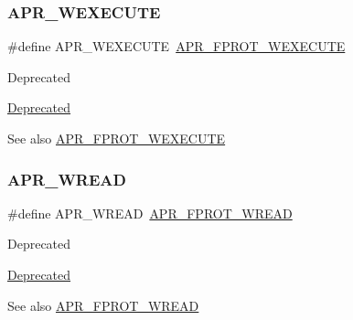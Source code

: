 \subsubsection{\texorpdfstring{A\+P\+R\+\_\+\+W\+E\+X\+E\+C\+U\+TE}{APR\_WEXECUTE}}
{\footnotesize\ttfamily \#define A\+P\+R\+\_\+\+W\+E\+X\+E\+C\+U\+TE~\mbox{\hyperlink{group__apr__file__permissions_ga760d69c09b38ddf1e0aff09362d8ce11}{A\+P\+R\+\_\+\+F\+P\+R\+O\+T\+\_\+\+W\+E\+X\+E\+C\+U\+TE}}}

\begin{DoxyRefDesc}{Deprecated}
\item[\mbox{\hyperlink{deprecated__deprecated000014}{Deprecated}}]\end{DoxyRefDesc}
\begin{DoxySeeAlso}{See also}
\mbox{\hyperlink{group__apr__file__permissions_ga760d69c09b38ddf1e0aff09362d8ce11}{A\+P\+R\+\_\+\+F\+P\+R\+O\+T\+\_\+\+W\+E\+X\+E\+C\+U\+TE}} 
\end{DoxySeeAlso}
\mbox{\label{group__apr__file__permissions_ga5c987d2b1ace95b4ffa7c5a322721aad}} 
\subsubsection{\texorpdfstring{A\+P\+R\+\_\+\+W\+R\+E\+AD}{APR\_WREAD}}
{\footnotesize\ttfamily \#define A\+P\+R\+\_\+\+W\+R\+E\+AD~\mbox{\hyperlink{group__apr__file__permissions_ga194718630250b0f0dd4be38c86dac717}{A\+P\+R\+\_\+\+F\+P\+R\+O\+T\+\_\+\+W\+R\+E\+AD}}}

\begin{DoxyRefDesc}{Deprecated}
\item[\mbox{\hyperlink{deprecated__deprecated000012}{Deprecated}}]\end{DoxyRefDesc}
\begin{DoxySeeAlso}{See also}
\mbox{\hyperlink{group__apr__file__permissions_ga194718630250b0f0dd4be38c86dac717}{A\+P\+R\+\_\+\+F\+P\+R\+O\+T\+\_\+\+W\+R\+E\+AD}} 
\end{DoxySeeAlso}
\mbox{\label{group__apr__file__permissions_ga824d6685d59e3efddb6ee7fdbee69c13}} 
